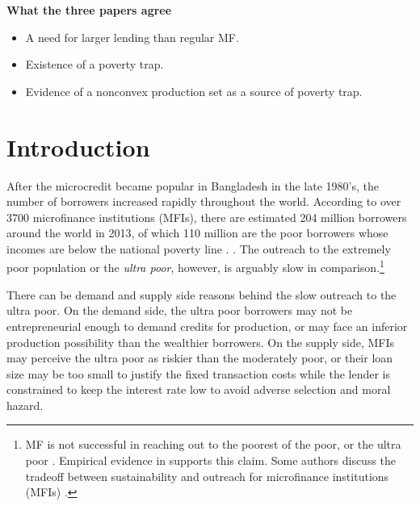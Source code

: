 \noindent
\textbf{What the three papers agree}

\begin{itemize}
\vspace{1.0ex}\setlength{\itemsep}{1.0ex}\setlength{\baselineskip}{12pt}
\item	A need for larger lending than regular MF.
\item	Existence of a poverty trap.
\item	Evidence of a nonconvex production set as a source of poverty trap.
\end{itemize}

\newpage
{}
\setcounter{tocdepth}{3}
\tableofcontents
\thispagestyle{empty}\setcounter{page}{0}
\newpage

\setlength{\parindent}{1em}
\vspace{2ex}




\renewcommand{\thefootnote}{*\arabic{footnote}}
\setcounter{footnote}{0}



\section{Introduction}
\label{SecIntroduction}




	After the microcredit became popular in Bangladesh in the late 1980's, the number of borrowers increased rapidly throughout the world. According to over 3700 microfinance institutions (MFIs), there are estimated 204 million borrowers around the world in 2013, of which 110 million are the poor borrowers whose incomes are below the national poverty line \citep{MFGateway2015}.  \citep{Tolzmann2022}.  The outreach to the extremely poor population or the \textit{ultra poor}, however, is arguably slow in comparison.\footnote{MF is not successful in reaching out to the poorest of the poor, or the ultra poor \citep[][]{Scully2004}. Empirical evidence in \citet{Yaron1994, Navajas2000, RahmanRazzaque2000, AghionMorduch2007} supports this claim. Some authors discuss the tradeoff between sustainability and outreach for microfinance institutions (MFIs) \citet{HermesLensink2011, HermesLensinkMeesters2011, Cull2011}. } 

	There can be demand and supply side reasons behind the slow outreach to the ultra poor. On the demand side, the ultra poor borrowers may not be entrepreneurial enough to demand credits for production, or may face an inferior production possibility than the wealthier borrowers. On the supply side, MFIs may perceive the ultra poor as riskier than the moderately poor, or their loan size may be too small to justify the fixed transaction costs while the lender is constrained to keep the interest rate low to avoid adverse selection and moral hazard. 

